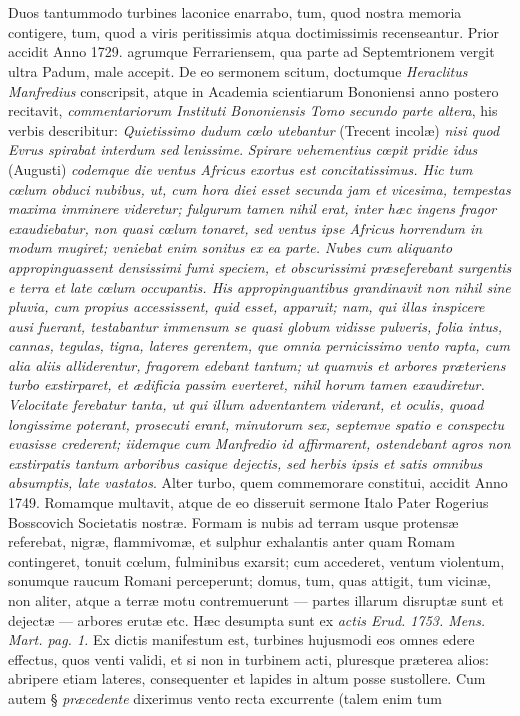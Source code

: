 \documentclass[a4paper, 11pt, oneside, polutonikogreek, latin]{article}
\begin{document}
\section[Lapides Strkowienses non sunt in aera sublati turbine.]{}
\paragraph{}
Duos tantummodo turbines laconice enarrabo, tum, quod nostra memoria contigere, tum, quod a viris peritissimis atqua doctimissimis recenseantur. Prior accidit Anno 1729. agrumque Ferrariensem, qua parte ad Septemtrionem vergit ultra Padum, male accepit. De eo sermonem scitum, doctumque \emph{Heraclitus Manfredius} conscripsit, atque in Academia scientiarum Bononiensi anno postero recitavit, \emph{commentariorum Instituti Bononiensis Tomo secundo parte altera}, his verbis describitur: \emph{Quietissimo dudum cœlo utebantur} (Trecent incolæ) \emph{nisi quod Evrus spirabat interdum sed lenissime}. \emph{Spirare vehementius cœpit pridie idus} (Augusti) \emph{codemque die ventus Africus exortus est concitatissimus. Hic tum cœlum obduci nubibus, ut, cum hora diei esset secunda jam et vicesima, tempestas maxima imminere videretur; fulgurum tamen nihil erat, inter hæc ingens fragor exaudiebatur, non quasi cœlum tonaret, sed ventus ipse Africus horrendum in modum mugiret; veniebat enim sonitus ex ea parte. Nubes cum aliquanto appropinguassent densissimi fumi speciem, et obscurissimi præseferebant surgentis e terra et late cœlum occupantis. His appropinguantibus grandinavit non nihil sine pluvia, cum propius accessissent, quid esset, apparuit; nam, qui illas inspicere ausi fuerant, testabantur immensum se quasi globum vidisse pulveris, folia intus, cannas, tegulas, tigna, lateres gerentem, que omnia pernicissimo vento rapta, cum alia aliis alliderentur, fragorem edebant tantum; ut quamvis et arbores præteriens turbo exstirparet, et ædificia passim everteret, nihil horum tamen exaudiretur. Velocitate ferebatur tanta, ut qui illum adventantem viderant, et oculis, quoad longissime poterant, prosecuti erant, minutorum sex, septemve spatio e conspectu evasisse crederent; iidemque cum Manfredio id affirmarent, ostendebant agros non exstirpatis tantum arboribus casique dejectis, sed herbis ipsis et satis omnibus absumptis, late vastatos}. Alter turbo, quem commemorare constitui, accidit Anno 1749. Romamque multavit, atque de eo disseruit sermone Italo Pater Rogerius Bosscovich Societatis nostræ. Formam is nubis ad terram usque protensæ referebat, nigræ, flammivomæ, et sulphur exhalantis anter quam Romam contingeret, tonuit cœlum, fulminibus exarsit; cum accederet, ventum violentum, sonumque raucum Romani perceperunt; domus, tum, quas attigit, tum vicinæ, non aliter, atque a terræ motu contremuerunt --- partes illarum disruptæ sunt et dejectæ --- arbores erutæ etc. Hæc desumpta sunt ex \emph{actis Erud. 1753. Mens. Mart. pag. 1.} Ex dictis manifestum est, turbines hujusmodi eos omnes edere effectus, quos venti validi, et si non in turbinem acti, pluresque præterea alios: abripere etiam lateres, consequenter et lapides in altum posse sustollere. Cum autem § \emph{præcedente} dixerimus vento recta excurrente (talem enim tum 
\end{document}

